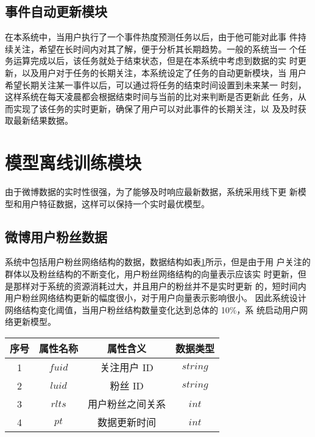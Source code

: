\subsection{事件自动更新模块}
在本系统中，当用户执行了一个事件热度预测任务以后，由于他可能对此事 件持续关注，希望在长时间内对其了解，便于分析其长期趋势。一般的系统当一 个任务运算完成以后，该任务就处于结束状态，但是在本系统中考虑到数据的实
 时更新，以及用户对于任务的长期关注，本系统设定了任务的自动更新模块，当 用户希望长期关注某一事件以后，可以通过将任务的结束时间设置到未来某一 时刻，这样系统在每天凌晨都会根据结束时间与当前的比对来判断是否更新此 任务，从而实现了该任务的实时更新，确保了用户可以对此事件的长期关注，以 及及时获取最新结果数据。

\section{模型离线训练模块}
由于微博数据的实时性很强，为了能够及时响应最新数据，系统采用线下更
新模型和用户特征数据，这样可以保持一个实时最优模型。

\subsection{微博用户粉丝数据}
系统中包括用户粉丝网络结构的数据，数据结构如表\ref{tab:t53}所示，但是由于用 户关注的群体以及粉丝结构的不断变化，用户粉丝网络结构的向量表示应该实 时更新，但是那样对于系统的资源消耗过大，并且用户的粉丝并不是实时更新 的，短时间内用户粉丝网络结构更新的幅度很小，对于用户向量表示影响很小。 因此系统设计网络结构变化阈值，当用户粉丝结构数量变化达到总体的 10\%，系 统启动用户网络更新模型。

\begin{table}[H]
    \centering
    \footnotesize%
      \label{tab:t53}
    \setlength{\tabcolsep}{30pt}%
    \renewcommand{\arraystretch}{1.2}%
    \begin{tabular}{cccc}
        \hline
         \textbf{序号} & \textbf{属性名称} & \textbf{属性含义} & \textbf{数据类型}   \\
        \hline
         1 & $fuid$ & 关注用户 ID & $string$ \\
         2 & $luid$ & 粉丝 ID& $string$ \\
         3 & $rlts$ & 用户粉丝之间关系 & $int$\\
         4 & $pt$ &  数据更新时间 & $int$ \\
        \hline
    \end{tabular}
     
\end{table}

